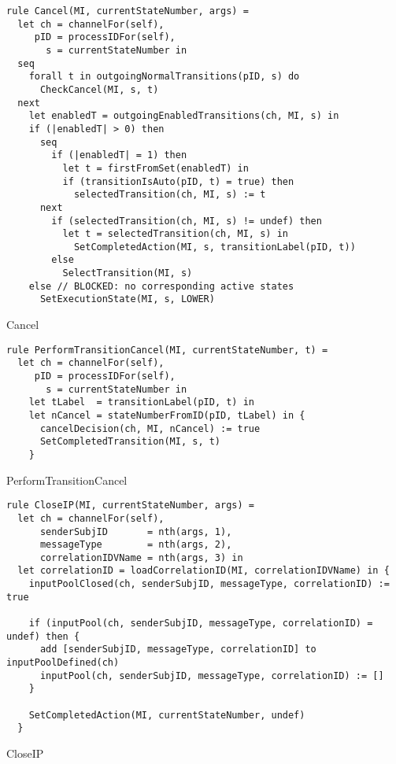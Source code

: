 \begin{listing}[H]
\begin{verbatim}
rule Cancel(MI, currentStateNumber, args) =
  let ch = channelFor(self),
     pID = processIDFor(self),
       s = currentStateNumber in
  seq
    forall t in outgoingNormalTransitions(pID, s) do
      CheckCancel(MI, s, t)
  next
    let enabledT = outgoingEnabledTransitions(ch, MI, s) in
    if (|enabledT| > 0) then
      seq
        if (|enabledT| = 1) then
          let t = firstFromSet(enabledT) in
          if (transitionIsAuto(pID, t) = true) then
            selectedTransition(ch, MI, s) := t
      next
        if (selectedTransition(ch, MI, s) != undef) then
          let t = selectedTransition(ch, MI, s) in
            SetCompletedAction(MI, s, transitionLabel(pID, t))
        else
          SelectTransition(MI, s)
    else // BLOCKED: no corresponding active states
      SetExecutionState(MI, s, LOWER)
\end{verbatim}
\caption{Cancel}
\label{lst:asm:Cancel}
\end{listing}




\begin{listing}[H]
\begin{verbatim}
rule PerformTransitionCancel(MI, currentStateNumber, t) =
  let ch = channelFor(self),
     pID = processIDFor(self),
       s = currentStateNumber in
    let tLabel  = transitionLabel(pID, t) in
    let nCancel = stateNumberFromID(pID, tLabel) in {
      cancelDecision(ch, MI, nCancel) := true
      SetCompletedTransition(MI, s, t)
    }
\end{verbatim}
\caption{PerformTransitionCancel}
\label{lst:asm:PerformTransitionCancel}
\end{listing}






\begin{listing}[H]
\begin{verbatim}
rule CloseIP(MI, currentStateNumber, args) =
  let ch = channelFor(self),
      senderSubjID       = nth(args, 1),
      messageType        = nth(args, 2),
      correlationIDVName = nth(args, 3) in
  let correlationID = loadCorrelationID(MI, correlationIDVName) in {
    inputPoolClosed(ch, senderSubjID, messageType, correlationID) := true

    if (inputPool(ch, senderSubjID, messageType, correlationID) = undef) then {
      add [senderSubjID, messageType, correlationID] to inputPoolDefined(ch)
      inputPool(ch, senderSubjID, messageType, correlationID) := []
    }

    SetCompletedAction(MI, currentStateNumber, undef)
  }
\end{verbatim}
\caption{CloseIP}
\label{lst:asm:CloseIP}
\end{listing}




